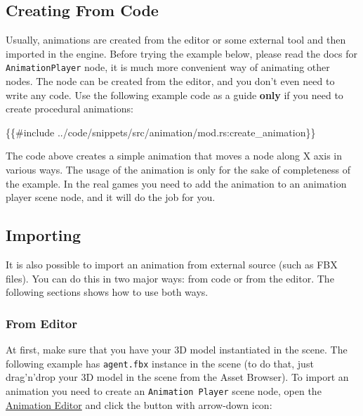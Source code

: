 \documentclass[
]{book}
\newenvironment{Shaded}{\begin{snugshade}}{\end{snugshade}}
\newcommand{\NormalTok}[1]{#1}
\theoremstyle{definition}
\theoremstyle{definition}
\theoremstyle{definition}
\theoremstyle{definition}
\theoremstyle{remark}
\begin{document}
\subsection{Creating From Code}\label{creating-from-code}

Usually, animations are created from the editor or some external tool and then imported in the engine. Before trying the example below, please read the docs for \texttt{AnimationPlayer} node, it is much more convenient way of animating other nodes. The node can be created from the editor, and you don't even need to write any code. Use the following example code as a guide \textbf{only} if you need to create procedural animations:

\begin{Shaded}
\begin{Highlighting}[]
\NormalTok{\{\{\#include ../code/snippets/src/animation/mod.rs:create\_animation\}\}}
\end{Highlighting}
\end{Shaded}

The code above creates a simple animation that moves a node along X axis in various ways. The usage of the animation is only for the sake of completeness of the example. In the real games you need to add the animation to an animation player scene node, and it will do the job for you.

\subsection{Importing}\label{importing}

It is also possible to import an animation from external source (such as FBX files). You can do this in two major ways: from code or from the editor. The following sections shows how to use both ways.

\subsubsection{From Editor}\label{from-editor-1}

At first, make sure that you have your 3D model instantiated in the scene. The following example has \texttt{agent.fbx} instance in the scene (to do that, just drag'n'drop your 3D model in the scene from the Asset Browser). To import an animation you need to create an \texttt{Animation\ Player} scene node, open the \href{anim_editor.md}{Animation Editor} and click the button with arrow-down icon:
\end{document}
